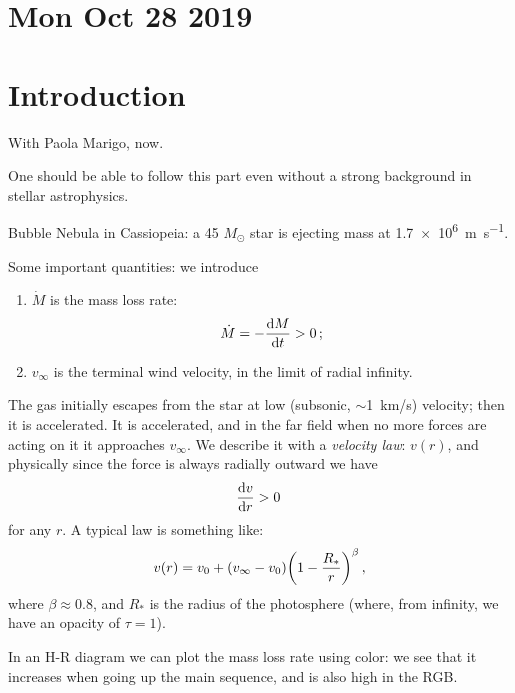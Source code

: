 \documentclass[main.tex]{subfiles}
\begin{document}
\section*{Mon Oct 28 2019}

\section{Introduction}

With Paola Marigo, now.

One should be able to follow this part even without a strong background in stellar astrophysics.

Bubble Nebula in Cassiopeia: a 45 \(M_{\odot}\) star is ejecting mass at \SI{1.7e6}{m\per\second}.

Some important quantities: we introduce 

\begin{enumerate}
    \item \(\dot{M}\) is the mass loss rate: 
    \begin{equation}
      \dot{M} = - \dv{M}{t} >0
    \,;
    \end{equation}
    \item \(v_{\infty}\) is the terminal wind velocity, in the limit of radial infinity.
\end{enumerate}

The gas initially escapes from the star at low (subsonic, \(\sim\)\SI{1}{km/s}) velocity; then it is accelerated.
It is accelerated, and in the far field when no more forces are acting on it it approaches \(v_{\infty}\).
We describe it with a \emph{velocity law}: \(v(r)\), and physically since the force is always radially outward we have 
%
\begin{equation}
  \dv{v}{r} > 0
\,
\end{equation}
%
for any \(r\). A typical law is something like: 
%
\begin{equation}
  v(r) = v_0 + \qty(v_{\infty}-v_{0} ) \qty(1 - \frac{R_{*}}{r})^{\beta }
\,,
\end{equation}
%
where \(\beta \approx 0.8\), and \(R_{*}\) is the radius of the photosphere (where, from infinity, we have an opacity of \(\tau = 1\)).

In an H-R diagram we can plot the mass loss rate using color: we see that it increases when going up the main sequence, and is also high in the RGB.
\end{document}
